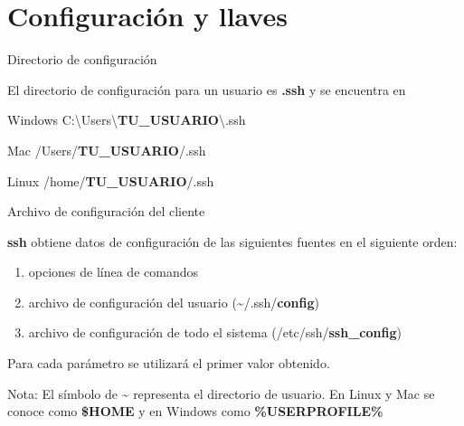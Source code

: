 \section{Configuración y llaves}

\begin{frame}[c]{Directorio de configuración}

  El directorio de configuración para un usuario es \textbf{.ssh}
  y se encuentra en

  \begin{exampleblock}{Windows}
    C:\textbackslash{}Users\textbackslash{}\textbf{TU\_USUARIO}\textbackslash{}.ssh
  \end{exampleblock}

  \pausa
  \begin{block}{Mac}
    /Users/\textbf{TU\_USUARIO}/.ssh
  \end{block}

  \pausa
  \begin{alertblock}{Linux}
    /home/\textbf{TU\_USUARIO}/.ssh
  \end{alertblock}
\end{frame}

\begin{frame}[c]{Archivo de configuración del cliente}

  \textbf{ssh} obtiene datos de configuración de las siguientes
  fuentes en el siguiente orden:

  \begin{enumerate}
    \item opciones de línea de comandos
    \pausa
    \item archivo de configuración del usuario (\~{}/.ssh/\textbf{config})
    \pausa
    \item archivo de configuración de todo el sistema
      (/etc/ssh/\textbf{ssh\_config})
  \end{enumerate}

  \vspace{\baselineskip}
  Para cada parámetro se utilizará el primer valor obtenido.

  \begin{exampleblock}{Nota:}
    El símbolo de \textbf{\~{}} representa el directorio de usuario. En
    Linux y Mac se conoce como \textbf{\$HOME} y en Windows como
    \textbf{\%USERPROFILE\%}
  \end{exampleblock}
\end{frame}

